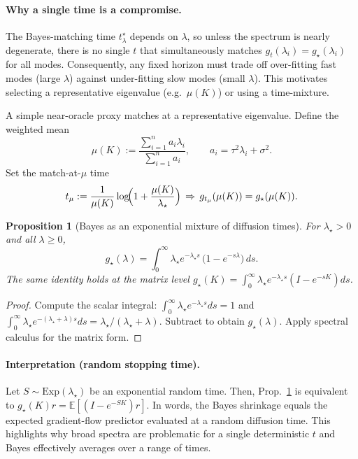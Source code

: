 \documentclass{article}
\theoremstyle{plain}
\newtheorem{proposition}[theorem]{Proposition}
\theoremstyle{definition}
\theoremstyle{remark}
\begin{document}
\paragraph{Why a single time is a compromise.}
The Bayes-matching time $t^\star_\lambda$ depends on $\lambda$, so unless the spectrum is nearly degenerate, there is no single $t$ that simultaneously matches $g_t(\lambda_i)=g_\star(\lambda_i)$ for all modes. Consequently, any fixed horizon must trade off over-fitting fast modes (large $\lambda$) against under-fitting slow modes (small $\lambda$). This motivates selecting a representative eigenvalue (e.g.\ $\mu(K)$) or using a time-mixture.


A simple near-oracle proxy matches at a representative eigenvalue. Define the weighted mean
\begin{equation}
\mu(K):=\frac{\sum_{i=1}^n a_i\lambda_i}{\sum_{i=1}^n a_i},
\qquad a_i=\tau^2\lambda_i+\sigma^2.
\label{eq:app_mu_short}
\end{equation}
Set the match-at-$\mu$ time
\begin{equation}
t_\mu:=\frac{1}{\mu(K)}\log\!\Bigl(1+\frac{\mu(K)}{\lambda_\star}\Bigr)
\, \Rightarrow\, g_{t_\mu}(\mu(K))=g_\star(\mu(K)).
\label{eq:app_tmu_short}
\end{equation}


\begin{proposition}[Bayes as an exponential mixture of diffusion times]\label{prop:app_mixture_short}
For $\lambda_\star>0$ and all $\lambda\ge 0$,
\begin{equation}
    g_\star(\lambda)
    =\int_0^\infty \lambda_\star e^{-\lambda_\star s}\,\bigl(1-e^{-s\lambda}\bigr)\,ds.
\label{eq:app_mixture_short}
\end{equation}
The same identity holds at the matrix level $g_\star(K)=\int_0^\infty \lambda_\star e^{-\lambda_\star s}(I-e^{-sK})ds$.
\end{proposition}
\begin{proof}
Compute the scalar integral:
$\int_0^\infty \lambda_\star e^{-\lambda_\star s}ds=1$ and
$\int_0^\infty \lambda_\star e^{-(\lambda_\star+\lambda)s}ds=\lambda_\star/(\lambda_\star+\lambda)$.
Subtract to obtain $g_\star(\lambda)$. Apply spectral calculus for the matrix form.
\end{proof}


\paragraph{Interpretation (random stopping time).}
Let $S\sim\mathrm{Exp}(\lambda_\star)$ be an exponential random time. Then, Prop.~\ref{prop:app_mixture_short} is equivalent to $g_\star(K)r=\mathbb{E}[(I-e^{-SK})r]$. In words, the Bayes shrinkage equals the expected gradient-flow predictor evaluated at a random diffusion time. This highlights why broad spectra are problematic for a single deterministic $t$ and Bayes effectively averages over a range of times.
\end{document}
